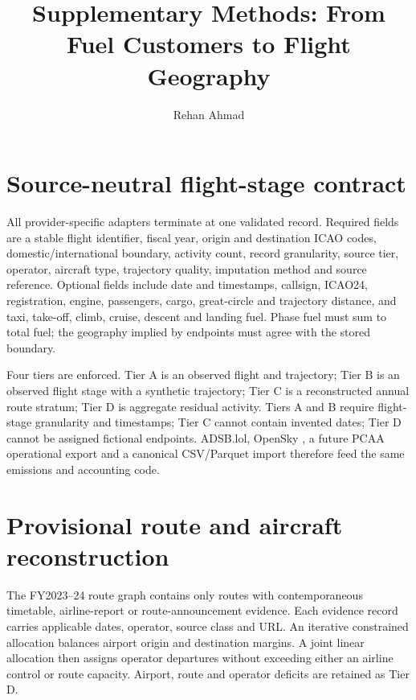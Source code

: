\documentclass[5p,times,authoryear]{elsarticle}
\begin{document}
\begin{frontmatter}
\title{Supplementary Methods: From Fuel Customers to Flight Geography}
\author[paqi]{Rehan Ahmad}
\address[paqi]{Pakistan Air Quality Initiative (PAQI), Karachi, Pakistan}
\end{frontmatter}

\ReleaseCover


\section{Source-neutral flight-stage contract}

All provider-specific adapters terminate at one validated record. Required fields are a stable
flight identifier, fiscal year, origin and destination ICAO codes, domestic/international
boundary, activity count, record granularity, source tier, operator, aircraft type, trajectory
quality, imputation method and source reference. Optional fields include date and timestamps,
callsign, ICAO24, registration, engine, passengers, cargo, great-circle and trajectory distance,
and taxi, take-off, climb, cruise, descent and landing fuel. Phase fuel must sum to total fuel;
the geography implied by endpoints must agree with the stored boundary.

Four tiers are enforced. Tier A is an observed flight and trajectory; Tier B is an observed
flight stage with a synthetic trajectory; Tier C is a reconstructed annual route stratum; Tier
D is aggregate residual activity. Tiers A and B require flight-stage granularity and timestamps;
Tier C cannot contain invented dates; Tier D cannot be assigned fictional endpoints. ADSB.lol,
OpenSky \citep{adsblolhistory,schaefer2014opensky}, a future PCAA operational export and a
canonical CSV/Parquet import therefore feed the same emissions and accounting code.

\section{Provisional route and aircraft reconstruction}

The FY2023--24 route graph contains only routes with contemporaneous timetable, airline-report
or route-announcement evidence. Each evidence record carries applicable dates, operator, source
class and URL. An iterative constrained allocation balances airport origin and destination
margins. A joint linear allocation then assigns operator departures without exceeding either an
airline control or route capacity. Airport, route and operator deficits are retained as Tier D.
\end{document}
